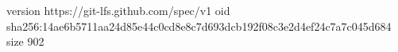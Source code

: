 version https://git-lfs.github.com/spec/v1
oid sha256:14ae6b5711aa24d85e44c0cd8e8c7d693dcb192f08c3e2d4ef24c7a7c045d684
size 902
